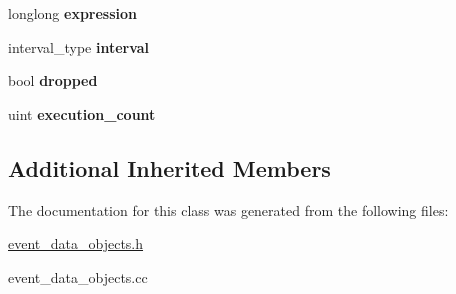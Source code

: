 \begin{DoxyCompactItemize}
\item 
\mbox{\label{classEvent__queue__element_a769e5e5293b35a31e3e5dba1dcf6fd29}} 
longlong {\bfseries expression}
\item 
\mbox{\label{classEvent__queue__element_a7b0abae480ea3b4876fd73fd1cf09bbb}} 
interval\+\_\+type {\bfseries interval}
\item 
\mbox{\label{classEvent__queue__element_a611cbd581cfb187d885076544fa2a5d0}} 
bool {\bfseries dropped}
\item 
\mbox{\label{classEvent__queue__element_a1880d5cbfdb0a7f0e50f5b81d1716936}} 
uint {\bfseries execution\+\_\+count}
\end{DoxyCompactItemize}
\subsection*{Additional Inherited Members}


The documentation for this class was generated from the following files\+:\begin{DoxyCompactItemize}
\item 
\mbox{\hyperlink{event__data__objects_8h}{event\+\_\+data\+\_\+objects.\+h}}\item 
event\+\_\+data\+\_\+objects.\+cc\end{DoxyCompactItemize}
